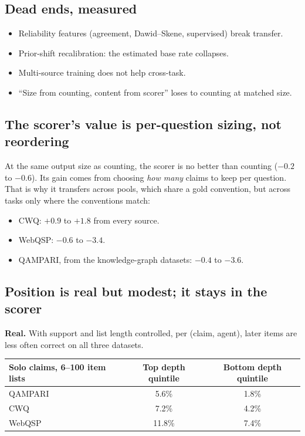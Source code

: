 \documentclass[11pt]{article}
\begin{document}
\subsection{Dead ends, measured}
\begin{itemize}
  \item Reliability features (agreement, Dawid--Skene, supervised) break transfer.
  \item Prior-shift recalibration: the estimated base rate collapses.
  \item Multi-source training does not help cross-task.
  \item ``Size from counting, content from scorer'' loses to counting at matched size.
\end{itemize}

\subsection{The scorer's value is per-question sizing, not reordering}

At the same output size as counting, the scorer is no better than counting
($-0.2$ to $-0.6$). Its gain comes from choosing \emph{how many} claims to keep
per question. That is why it transfers across pools, which share a gold
convention, but across tasks only where the conventions match:
\begin{itemize}
  \item CWQ: $+0.9$ to $+1.8$ from every source.
  \item WebQSP: $-0.6$ to $-3.4$.
  \item QAMPARI, from the knowledge-graph datasets: $-0.4$ to $-3.6$.
\end{itemize}

\subsection{Position is real but modest; it stays in the scorer}

\textbf{Real.} With support and list length controlled, per (claim, agent),
later items are less often correct on all three datasets.

\begin{center}
\begin{tabular}{lcc}
\toprule
Solo claims, 6--100 item lists & Top depth quintile & Bottom depth quintile \\
\midrule
QAMPARI & 5.6\% & 1.8\% \\
CWQ     & 7.2\% & 4.2\% \\
WebQSP  & 11.8\% & 7.4\% \\
\bottomrule
\end{tabular}
\end{center}
\end{document}

